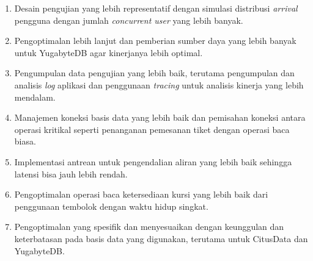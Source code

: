 \begin{enumerate}
    \item Desain pengujian yang lebih representatif dengan simulasi distribusi \textit{arrival} pengguna dengan jumlah \textit{concurrent user} yang lebih banyak.
    \item Pengoptimalan lebih lanjut dan pemberian sumber daya yang lebih banyak untuk YugabyteDB agar kinerjanya lebih optimal.
    \item Pengumpulan data pengujian yang lebih baik, terutama pengumpulan dan analisis \textit{log} aplikasi dan penggunaan \textit{tracing} untuk analisis kinerja yang lebih mendalam.
    \item Manajemen koneksi basis data yang lebih baik dan pemisahan koneksi antara operasi kritikal seperti penanganan pemesanan tiket dengan operasi baca biasa.
    \item Implementasi antrean untuk pengendalian aliran yang lebih baik sehingga latensi bisa jauh lebih rendah.
    \item Pengoptimalan operasi baca ketersediaan kursi yang lebih baik dari penggunaan tembolok dengan waktu hidup singkat.
    \item Pengoptimalan yang spesifik dan menyesuaikan dengan keunggulan dan keterbatasan pada basis data yang digunakan, terutama untuk CitusData dan YugabyteDB.
\end{enumerate}